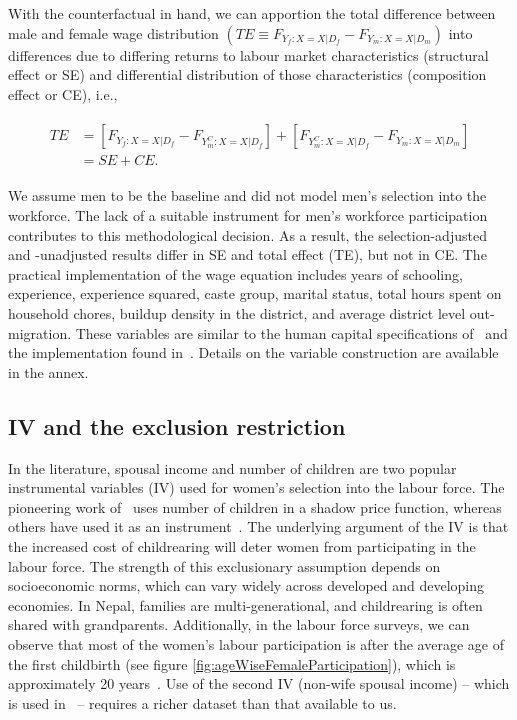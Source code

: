 With the counterfactual in hand, we can apportion the total difference between male and female wage distribution $(TE \equiv F_{Y_{f}:X=X|D_{f}}  - F_{Y_{m}:X=X|D_{m}})$
into differences due to differing returns to labour market characteristics (structural effect or SE) and differential distribution of those characteristics (composition effect or CE), i.e.,
\begin{linenomath*}\begin{align}
	\begin{split}		
		TE &= \left[F_{Y_{f}:X=X|D_{f}} - F_{Y_{m}^{C}:X=X|D_{f}}\right] + \left[F_{Y_{m}^{C}:X=X|D_{f}} - F_{Y_{m}:X=X|D_{m}}\right]\\
		&= SE + CE. \label{eq:TEdefn}
	\end{split}
\end{align}\end{linenomath*}

We assume men to be the baseline and did not model men’s selection into the workforce. The lack of a suitable instrument for men’s workforce participation contributes to this methodological decision. As a result, the selection-adjusted and -unadjusted results differ in SE and total effect (TE), but not in CE. The practical implementation of the wage equation includes years of schooling, experience, experience squared, caste group, marital status, total hours spent on household chores, buildup density in the district, and average district level out-migration. These variables are similar to the human capital specifications of~\citet{Blau2017} and the implementation found in~\citet{Maasoumi2019}. Details on the variable construction are available in the annex.\par
                                   
\subsection{IV and the exclusion restriction}
In the literature, spousal income and number of children are two popular instrumental variables (IV) used for women’s selection into the labour force. The pioneering work of~\citet{Heckman1974} uses number of children in a shadow price function, whereas others have used it as an instrument~\citep{Mulligan2008, Maasoumi2019, Heckman1980, chang2011labor, Lee2009}. The underlying argument of the IV is that the increased cost of childrearing will deter women from participating in the labour force. The strength of this exclusionary assumption depends on socioeconomic norms, which can vary widely across developed and developing economies. In Nepal, families are multi-generational, and childrearing is often shared with grandparents. Additionally, in the labour force surveys, we can observe that most of the women’s labour participation is after the average age of the first childbirth (see figure \ref{fig:ageWiseFemaleParticipation}), which is approximately 20 years~\citep{DHS2016}. Use of the second IV (non-wife spousal income) -- which is used in~\citet{schafgans1998ethnic, Martins2001} -- requires a richer dataset than that available to us.\par

